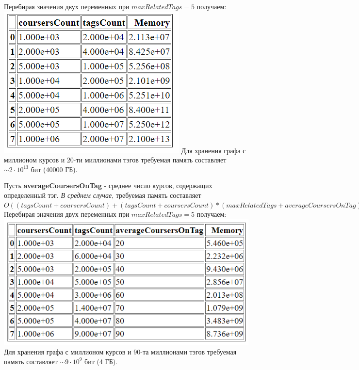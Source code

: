 \documentclass[12pt]{article}
\begin{document}
\noindent Перебирая значения двух переменных при $maxRelatedTags = 5$ получаем: \newline
\includegraphics[scale=1.2]{images/memory.png} \newline
Для хранения графа с миллионом курсов и $20$-ти миллионами тэгов требуемая память составляет $\sim 2 \cdot 10^{13}$ бит (40000 ГБ). \newline

\noindent Пусть \textbf{averageCoursersOnTag} - среднее число курсов, содержащих определенный тэг. \newline
\textit{В среднем случае}, требуемая память составляет $O((tagsCount + coursersCount) + (tagsCount + coursersCount)*(maxRelatedTags + averageCoursersOnTag))$ \newline
Перебирая значения двух переменных при $maxRelatedTags = 5$ получаем: \newline
\includegraphics[scale=1.2]{images/memoryAverage.png} \newline
Для хранения графа с миллионом курсов и $90$-та миллионами тэгов требуемая память составляет $\sim 9 \cdot 10^{9}$ бит (4 ГБ). \newline
\end{document}
